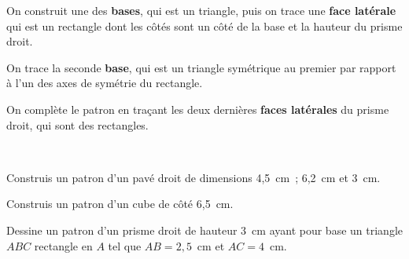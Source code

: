\begin{methode*1}
\begin{exemple*1}
 \begin{minipage}[t]{0.3\linewidth}      
On construit une des \textcolor{C2}{\textbf{bases}}, qui est un triangle, puis on trace une \textcolor{H2}{\textbf{face latérale}} qui est un rectangle dont les côtés sont un côté de la base et la hauteur du prisme droit.
  \end{minipage} \hfill%
  \begin{minipage}[t]{0.3\linewidth}
On trace la seconde \textcolor{C2}{\textbf{base}}, qui est un triangle symétrique au premier par rapport à l'un des axes de symétrie du rectangle.
  \end{minipage} \hfill%
   \begin{minipage}[t]{0.3\linewidth}   
On complète le patron en traçant les deux dernières \textcolor{U1}{\textbf{faces latérales}} du prisme droit, qui sont des rectangles.
   \end{minipage} \\
 \end{exemple*1}

 \exercice  
Construis un patron d'un pavé droit de dimensions 4,5 cm ; 6,2 cm et 3 cm.

 \exercice  
Construis un patron d'un cube de côté 6,5 cm.

 \exercice  
Dessine un patron d'un prisme droit de hauteur 3 cm ayant pour base un triangle $ABC$ rectangle en $A$ tel que $AB = 2,5$ cm et $AC = 4$ cm.

 \end{methode*1}
 
 
